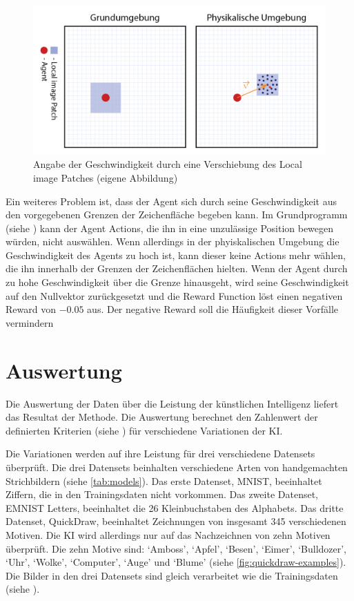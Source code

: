 \begin{figure}[!ht]
  \centering
  \includegraphics[width=\textwidth]{images/methode/patch-move.png}
  \caption{Angabe der Geschwindigkeit durch eine Verschiebung des Local image Patches (eigene Abbildung)}
  \label{fig:patch-move}
\end{figure}


Ein weiteres Problem ist, dass der Agent sich durch seine Geschwindigkeit aus
den vorgegebenen Grenzen der Zeichenfläche begeben kann. Im Grundprogramm  
(siehe ) kann der Agent Actions, die ihn in eine
unzulässige Position bewegen würden, nicht auswählen. Wenn allerdings in der
phyiskalischen Umgebung die Geschwindigkeit des Agents zu
hoch ist, kann dieser keine Actions mehr wählen, die ihn innerhalb der Grenzen
der Zeichenflächen hielten. Wenn der Agent durch zu hohe Geschwindigkeit
über die Grenze hinausgeht, wird seine Geschwindigkeit auf den Nullvektor
zurückgesetzt und die Reward Function löst einen negativen Reward von $-0.05$
aus. Der negative Reward soll die Häufigkeit dieser Vorfälle vermindern


\section{Auswertung}\label{chap:m_auswert}
Die Auswertung der Daten über die Leistung der künstlichen Intelligenz liefert
das Resultat der Methode. Die Auswertung berechnet den Zahlenwert der
definierten Kriterien (siehe ) für verschiedene Variationen
der KI.

Die Variationen werden auf ihre Leistung für drei verschiedene Datensets
überprüft. Die drei Datensets beinhalten verschiedene Arten von handgemachten
Strichbildern (siehe \autoref{tab:models}). Das erste Datenset, MNIST,
beeinhaltet Ziffern, die in den Trainingsdaten nicht vorkommen. Das zweite
Datenset, EMNIST Letters, beeinhaltet die 26 Kleinbuchstaben des Alphabets. Das
dritte Datenset, QuickDraw, beeinhaltet Zeichnungen von insgesamt 345
verschiedenen Motiven. Die KI wird allerdings nur auf das Nachzeichnen von zehn
Motiven überprüft. Die zehn Motive sind: `Amboss', `Apfel', `Besen', `Eimer',
`Bulldozer', `Uhr', `Wolke', `Computer', `Auge' und `Blume' (siehe
\autoref{fig:quickdraw-examples}). Die Bilder in den
drei Datensets sind gleich verarbeitet wie die Trainingsdaten (siehe
). 

